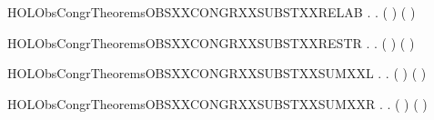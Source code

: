 \begin{SaveVerbatim}{HOLObsCongrTheoremsOBSXXCONGRXXSUBSTXXRELAB}
\HOLTokenTurnstile{} \HOLSymConst{\HOLTokenForall{}} .
          \HOLSymConst{\HOLTokenImp{}}
       \HOLSymConst{\HOLTokenForall{}}.  (  ) (  )
\end{SaveVerbatim}
\newcommand{\HOLObsCongrTheoremsOBSXXCONGRXXSUBSTXXRELAB}{\UseVerbatim{HOLObsCongrTheoremsOBSXXCONGRXXSUBSTXXRELAB}}
\begin{SaveVerbatim}{HOLObsCongrTheoremsOBSXXCONGRXXSUBSTXXRESTR}
\HOLTokenTurnstile{} \HOLSymConst{\HOLTokenForall{}} .    \HOLSymConst{\HOLTokenImp{}} \HOLSymConst{\HOLTokenForall{}}.  (\HOLConst{\ensuremath{\nu}}  ) (\HOLConst{\ensuremath{\nu}}  )
\end{SaveVerbatim}
\newcommand{\HOLObsCongrTheoremsOBSXXCONGRXXSUBSTXXRESTR}{\UseVerbatim{HOLObsCongrTheoremsOBSXXCONGRXXSUBSTXXRESTR}}
\begin{SaveVerbatim}{HOLObsCongrTheoremsOBSXXCONGRXXSUBSTXXSUMXXL}
\HOLTokenTurnstile{} \HOLSymConst{\HOLTokenForall{}} .    \HOLSymConst{\HOLTokenImp{}} \HOLSymConst{\HOLTokenForall{}}.  ( \HOLSymConst{+} ) ( \HOLSymConst{+} )
\end{SaveVerbatim}
\newcommand{\HOLObsCongrTheoremsOBSXXCONGRXXSUBSTXXSUMXXL}{\UseVerbatim{HOLObsCongrTheoremsOBSXXCONGRXXSUBSTXXSUMXXL}}
\begin{SaveVerbatim}{HOLObsCongrTheoremsOBSXXCONGRXXSUBSTXXSUMXXR}
\HOLTokenTurnstile{} \HOLSymConst{\HOLTokenForall{}} .    \HOLSymConst{\HOLTokenImp{}} \HOLSymConst{\HOLTokenForall{}}.  ( \HOLSymConst{+} ) ( \HOLSymConst{+} )
\end{SaveVerbatim}
